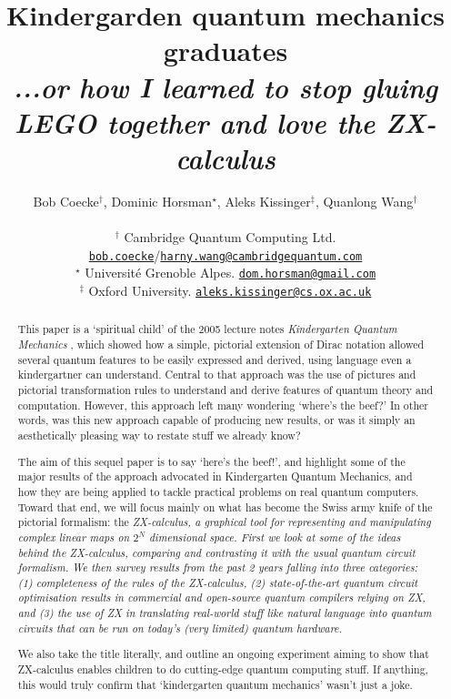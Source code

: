 \documentclass[11pt]{article}
\title{Kindergarden quantum mechanics graduates\vspace{2mm}
\\ \large\it ...or how I learned to stop gluing LEGO together and love the ZX-calculus}
\author{Bob Coecke${}^\dagger$, Dominic Horsman${}^\star$, Aleks Kissinger${}^\ddagger$, Quanlong Wang${}^\dagger$\\
\ \\ 
${}^\dagger$ Cambridge Quantum Computing Ltd. \\ \href{mailto:bob.coecke@cambridgequantum.com}{\tt bob.coecke}/\href{mailto:harny.wang@cambridgequantum.com}{\tt harny.wang@cambridgequantum.com} \\
${}^\star$ Universit\'e Grenoble Alpes. \href{mailto:dom.horsman@gmail.com}{\tt dom.horsman@gmail.com}\\
${}^\ddagger$ Oxford University. \href{mailto:aleks.kissinger@cs.ox.ac.uk}{\tt aleks.kissinger@cs.ox.ac.uk}
}
\theoremstyle{definition}
\def\bR{\begin{color}{red}}
\def\e{\end{color}\xspace}
\newcommand{\TODOb}[1]{\marginpar{\scriptsize\bR \textbf{TODO:} #1\e}}
\begin{document}
  
\maketitle 

\begin{abstract} 
This paper is a `spiritual child' of the 2005 lecture notes \textit{Kindergarten Quantum Mechanics} \cite{Kindergarten}, which showed how a simple, pictorial extension of Dirac notation allowed several quantum  features to be easily expressed and derived, using language even a kindergartner can understand.  Central to that approach was the use of pictures and pictorial transformation rules to understand and derive features of quantum theory and computation.  However, this approach left many wondering `where's the beef?' In other words, was this new approach capable of producing new results, or was it simply an aesthetically pleasing way to restate stuff we already know?

The aim of this sequel paper is to say `here's the beef!', and highlight some of the major results of the approach advocated in Kindergarten Quantum Mechanics, and how they are being applied to tackle practical problems on real quantum computers. Toward that end, we will focus mainly on what has become the Swiss army knife of the pictorial formalism: the \em ZX-calculus\em, a graphical tool for representing and manipulating complex linear maps on $2^N$ dimensional space. First we look at  
some of the ideas behind the ZX-calculus,  comparing and contrasting it with the usual quantum circuit formalism.
We then survey results from the past 2 years falling into three categories:
(1) completeness of the  rules of the ZX-calculus, (2) state-of-the-art quantum circuit optimisation results in commercial and open-source quantum compilers relying on ZX, and (3) the use of ZX in translating real-world stuff like natural language into quantum circuits  that can be run on today's (very limited) quantum hardware.

We also take the title literally, and outline an ongoing experiment aiming to show that ZX-calculus enables children to do cutting-edge quantum computing stuff. If anything, this would truly confirm that `kindergarten quantum mechanics' wasn't just a joke.
\end{abstract}
\end{document}
